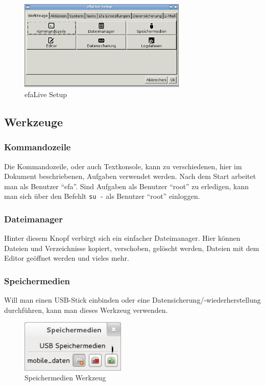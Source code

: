 \documentclass[a4paper,12pt,twoside]{article}
\begin{document}
\begin{figure}
    \centering
    \includegraphics[width=8cm]{screenshots/efalive_setup.png}
    \caption{efaLive Setup}
    \label{fig:efalivesetup}
\end{figure}

\subsection{Werkzeuge}
\label{sct:efalivesetup_tools}


\subsubsection{Kommandozeile}
\label{sct:kommandozeile}
Die Kommandozeile, oder auch Textkonsole, kann zu verschiedenen, hier im
Dokument beschriebenen, Aufgaben verwendet werden. Nach dem Start
arbeitet man als Benutzer "`efa"'. Sind
Aufgaben als Benutzer "`root"' zu erledigen,
kann man sich über den Befehlt \texttt{su -} als
Benutzer "`root"' einloggen.


\subsubsection{Dateimanager}
\label{sct:dateimanager}
Hinter diesem Knopf verbirgt sich ein einfacher Dateimanager. Hier
können Dateien und Verzeichnisse kopiert, verschoben, gelöscht werden,
Dateien mit dem Editor geöffnet werden und vieles mehr.


\subsubsection{Speichermedien}
\label{sct:dialog_speichermedien}
Will man einen USB-Stick einbinden
oder eine Datensicherung/-wiederherstellung durchführen, kann man
dieses Werkzeug verwenden.

\begin{figure}
    \centering
    \includegraphics[width=5cm]{screenshots/efaLivede-img20.png}
    \caption{Speichermedien Werkzeug}
    \label{fig:dialog_speichermedien}
\end{figure}
\end{document}
